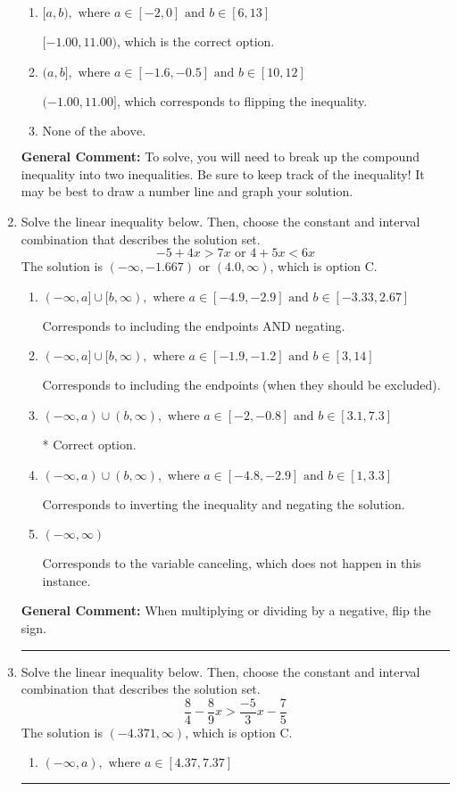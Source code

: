\documentclass{extbook}[14pt]
\newcommand{\litem}[1]{\item #1

\rule{\textwidth}{0.4pt}}
\begin{document}
\begin{enumerate}
{\begin{enumerate}[label=\Alph*.]
$(-\infty, -1.00) \cup [11.00, \infty)$, which corresponds to displaying the and-inequality as an or-inequality AND flipping the inequality.
\item \( [a, b), \text{ where } a \in [-2, 0] \text{ and } b \in [6, 13] \)

$[-1.00, 11.00)$, which is the correct option.
\item \( (a, b], \text{ where } a \in [-1.6, -0.5] \text{ and } b \in [10, 12] \)

$(-1.00, 11.00]$, which corresponds to flipping the inequality.
\item \( \text{None of the above.} \)


\end{enumerate}

\textbf{General Comment:} To solve, you will need to break up the compound inequality into two inequalities. Be sure to keep track of the inequality! It may be best to draw a number line and graph your solution.
}
\litem{
Solve the linear inequality below. Then, choose the constant and interval combination that describes the solution set.
\[ -5 + 4 x > 7 x \text{ or } 4 + 5 x < 6 x \]The solution is \( (-\infty, -1.667) \text{ or } (4.0, \infty) \), which is option C.\begin{enumerate}[label=\Alph*.]
\item \( (-\infty, a] \cup [b, \infty), \text{ where } a \in [-4.9, -2.9] \text{ and } b \in [-3.33, 2.67] \)

Corresponds to including the endpoints AND negating.
\item \( (-\infty, a] \cup [b, \infty), \text{ where } a \in [-1.9, -1.2] \text{ and } b \in [3, 14] \)

Corresponds to including the endpoints (when they should be excluded).
\item \( (-\infty, a) \cup (b, \infty), \text{ where } a \in [-2, -0.8] \text{ and } b \in [3.1, 7.3] \)

 * Correct option.
\item \( (-\infty, a) \cup (b, \infty), \text{ where } a \in [-4.8, -2.9] \text{ and } b \in [1, 3.3] \)

Corresponds to inverting the inequality and negating the solution.
\item \( (-\infty, \infty) \)

Corresponds to the variable canceling, which does not happen in this instance.
\end{enumerate}

\textbf{General Comment:} When multiplying or dividing by a negative, flip the sign.
}
\litem{
Solve the linear inequality below. Then, choose the constant and interval combination that describes the solution set.
\[ \frac{8}{4} - \frac{8}{9} x > \frac{-5}{3} x - \frac{7}{5} \]The solution is \( (-4.371, \infty) \), which is option C.\begin{enumerate}[label=\Alph*.]
\item \( (-\infty, a), \text{ where } a \in [4.37, 7.37] \)


\end{enumerate}}
\end{enumerate}
\end{document}
